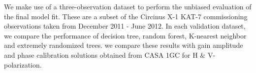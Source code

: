 We make use of a three-observation dataset to perform the unbiased evaluation of the final model fit. These are a subset of the Circinus X-1 KAT-7 commissioning observations taken from December 2011 - June 2012. In each validation dataset, we compare the performance of decision tree, random forest, K-nearest neighbor and extremely randomized trees. we compare these results with gain amplitude and phase calibration solutions obtained from CASA 1GC for H $\&$ V-polarization. 

%
%
%
%
